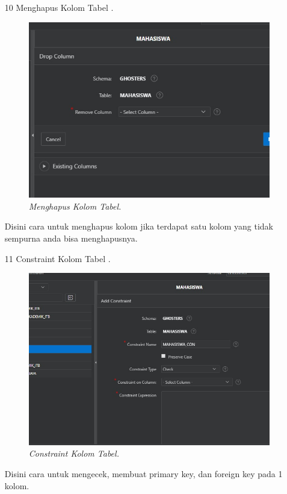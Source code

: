 \begin{enumerate}
\item[10]Menghapus Kolom Tabel .
\begin{figure}[!htbp]
    \begin{center}
    \includegraphics[scale=0.5]{figures/drop_column.jpg}
    \caption{\textit{Menghapus Kolom Tabel.}}
    \end{center}
\end{figure}
\par Disini cara untuk menghapus kolom jika terdapat satu kolom yang tidak sempurna anda bisa menghapusnya.


\item[11]Constraint Kolom Tabel .
\begin{figure}[!htbp]
    \begin{center}
    \includegraphics[scale=0.5]{figures/constrainst_column.jpg}
    \caption{\textit{Constraint Kolom Tabel.}}
    \end{center}
\end{figure}
\par Disini cara untuk mengecek, membuat primary key, dan foreign key pada 1 kolom.



\end{enumerate}
